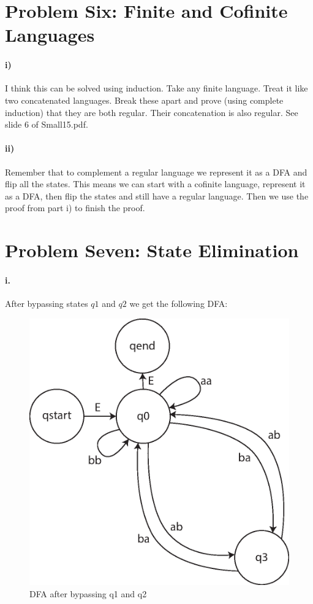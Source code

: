 \documentclass[10pt,letter]{article}
\begin{document}
\section*{Problem Six: Finite and Cofinite Languages}

\paragraph{i)} I think this can be solved using induction. Take any finite language. Treat it like two concatenated languages. Break these apart and prove (using complete induction) that they are both regular. Their concatenation is also regular. See slide 6 of Small15.pdf.

\paragraph{ii)} Remember that to complement a regular language we represent it as a DFA and flip all the states. This means we can start with a cofinite language, represent it as a DFA, then flip the states and still have a regular language. Then we use the proof from part i) to finish the proof.

\section*{Problem Seven: State Elimination}

\paragraph{i.} After bypassing states $q1$ and $q2$ we get the following DFA:\\

\begin{figure}[h]
\centering
  \includegraphics[width=0.45\linewidth]{7i.eps}
  \caption{DFA after bypassing q1 and q2}
  \label{fig:7i}
\end{figure}
\end{document}
